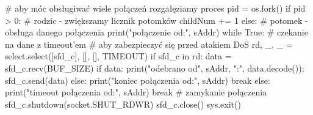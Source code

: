 \begin{CodeFrame*}[python]{}
        # aby móc obsługiwać wiele połączeń rozgałęziamy proces
        pid = os.fork()
        if pid > 0:
            # rodzic - zwiększamy licznik potomków
            childNum += 1
        else:
            # potomek - obsługa danego połączenia
            print("połączenie od:", sAddr)
            while True:
                # czekanie na dane z timeout'em
                # aby zabezpieczyć się przed atakiem DoS
                rd, _, _ = select.select([sfd_c], [], [], TIMEOUT)
                if sfd_c in rd:
                    data = sfd_c.recv(BUF_SIZE)
                    if data:
                        print("odebrano od", sAddr, ":", data.decode());
                        sfd_c.send(data)
                    else:
                        print("koniec połączenia od:", sAddr)
                        break
                else:
                    print("timeout połączenia od:", sAddr)
                    break
            # zamykanie połączenia
            sfd_c.shutdown(socket.SHUT_RDWR)
            sfd_c.close()
            sys.exit()
\end{CodeFrame*}
